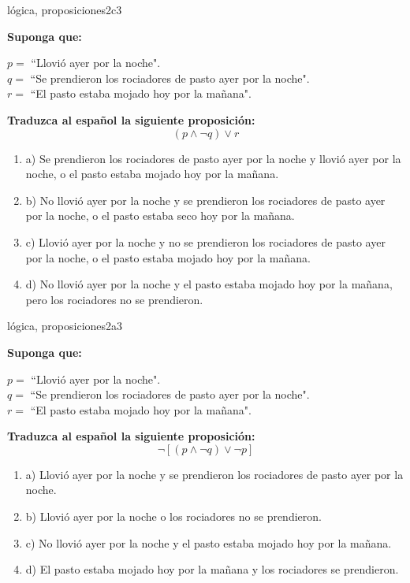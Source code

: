 \documentclass{article}
\begin{document}
\begin{question}{5}{lógica, proposiciones}{2}{c}{3}{
\textbf{Suponga que:} \smallskip

\(p = \) ``Llovió ayer por la noche".\\
\(q = \) ``Se prendieron los rociadores de pasto ayer por la noche".\\
\(r = \) ``El pasto estaba mojado hoy por la mañana".\smallskip

\textbf{Traduzca al español la siguiente proposición:}
\[
(p \land \neg q) \lor r
\]

\begin{enumerate}
   \item a) Se prendieron los rociadores de pasto ayer por la noche y llovió ayer por la noche, o el pasto estaba mojado hoy por la mañana.
   \item b) No llovió ayer por la noche y se prendieron los rociadores de pasto ayer por la noche, o el pasto estaba seco hoy por la mañana.
   \item c) Llovió ayer por la noche y no se prendieron los rociadores de pasto ayer por la noche, o el pasto estaba mojado hoy por la mañana.
   \item d) No llovió ayer por la noche y el pasto estaba mojado hoy por la mañana, pero los rociadores no se prendieron.
\end{enumerate}
}
\end{question}

\begin{question}{6}{lógica, proposiciones}{2}{a}{3}{
\textbf{Suponga que:} \smallskip

\(p = \) ``Llovió ayer por la noche".\\
\(q = \) ``Se prendieron los rociadores de pasto ayer por la noche".\\
\(r = \) ``El pasto estaba mojado hoy por la mañana".\smallskip

\textbf{Traduzca al español la siguiente proposición:}
\[
\neg [(p \land \neg q) \lor \neg p]
\]

\begin{enumerate}
   \item a) Llovió ayer por la noche y se prendieron los rociadores de pasto ayer por la noche.  
   \item b) Llovió ayer por la noche o los rociadores no se prendieron.  
   \item c) No llovió ayer por la noche y el pasto estaba mojado hoy por la mañana.  
   \item d) El pasto estaba mojado hoy por la mañana y los rociadores se prendieron.  
\end{enumerate}
}
\end{question}
\end{document}
